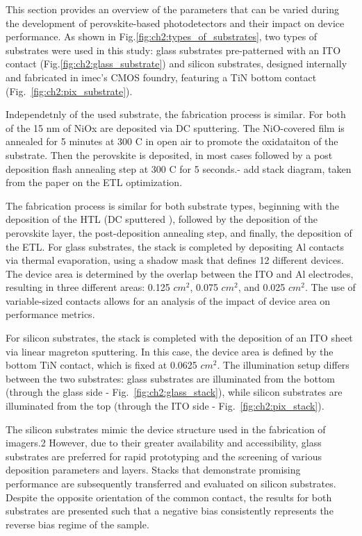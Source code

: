 This section provides an overview of the parameters that can be varied during the development of perovskite-based photodetectors and their impact on device performance. As shown in Fig.\ref{fig:ch2:types_of_substrates}, two types of substrates were used in this study: glass substrates pre-patterned with an ITO contact (Fig.\ref{fig:ch2:glass_substrate}) and silicon substrates, designed internally and fabricated in imec's CMOS foundry, featuring a TiN bottom contact (Fig.~\ref{fig:ch2:pix_substrate}).

Independetnly of the used substrate, the fabrication process is similar. For both of the 15 nm of NiOx are deposited via DC sputtering. The NiO-covered film is annealed for 5 minutes at 300 C in open air to promote the oxidataiton of the substrate. Then the perovskite is deposited, in most cases followed by a post deposition flash annealing step at 300 C for 5 seconds.- add stack diagram, taken from the paper on the ETL optimization.

The fabrication process is similar for both substrate types, beginning with the deposition of the HTL (DC sputtered ), followed by the deposition of the perovskite layer, the post-deposition annealing step, and finally, the deposition of the ETL. For glass substrates, the stack is completed by depositing Al contacts via thermal evaporation, using a shadow mask that defines 12 different devices. The device area is determined by the overlap between the ITO and Al electrodes, resulting in three different areas: 0.125 $cm^2$, 0.075 $cm^2$, and 0.025 $cm^2$. The use of variable-sized contacts allows for an analysis of the impact of device area on performance metrics.

For silicon substrates, the stack is completed with the deposition of an ITO sheet via linear magreton sputtering. In this case, the device area is defined by the bottom TiN contact, which is fixed at 0.0625 $cm^2$. The illumination setup differs between the two substrates: glass substrates are illuminated from the bottom (through the glass side - Fig.~\ref{fig:ch2:glass_stack}), while silicon substrates are illuminated from the top (through the ITO side - Fig.~\ref{fig:ch2:pix_stack}). 

The silicon substrates mimic the device structure used in the fabrication of imagers.2 However, due to their greater availability and accessibility, glass substrates are preferred for rapid prototyping and the screening of various deposition parameters and layers. Stacks that demonstrate promising performance are subsequently transferred and evaluated on silicon substrates. Despite the opposite orientation of the common contact, the results for both substrates are presented such that a negative bias consistently represents the reverse bias regime of the sample.


